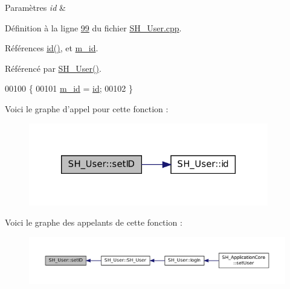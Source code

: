 \begin{DoxyParams}{Paramètres}
{\em id} & \\
\hline
\end{DoxyParams}


Définition à la ligne \hyperlink{SH__User_8cpp_source_l00099}{99} du fichier \hyperlink{SH__User_8cpp_source}{S\-H\-\_\-\-User.\-cpp}.



Références \hyperlink{classSH__User_addf3cb1d491eea2df592dee5c9081d32}{id()}, et \hyperlink{classSH__User_a701e1d1238c488e46e8d1dcc7dbe8dc0}{m\-\_\-id}.



Référencé par \hyperlink{classSH__User_a96c0ebb3f11c1654935aaecb92295724}{S\-H\-\_\-\-User()}.


\begin{DoxyCode}
00100 \{
00101     \hyperlink{classSH__User_a701e1d1238c488e46e8d1dcc7dbe8dc0}{m\_id} = \hyperlink{classSH__User_addf3cb1d491eea2df592dee5c9081d32}{id};
00102 \}
\end{DoxyCode}


Voici le graphe d'appel pour cette fonction \-:\nopagebreak
\begin{figure}[H]
\begin{center}
\leavevmode
\includegraphics[width=296pt]{classSH__User_ad3195a7010669a0d007cf95606562eb3_cgraph}
\end{center}
\end{figure}




Voici le graphe des appelants de cette fonction \-:\nopagebreak
\begin{figure}[H]
\begin{center}
\leavevmode
\includegraphics[width=350pt]{classSH__User_ad3195a7010669a0d007cf95606562eb3_icgraph}
\end{center}
\end{figure}


